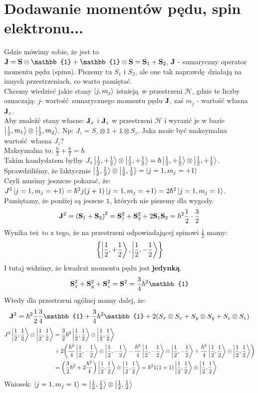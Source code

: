 \documentclass[12pt,a4paper]{report}
\newcommand{\Id}{\mathbb{1}}
\renewcommand{\emph}{\textbf}
\newenvironment{lecture}[1]{\par\medskip
   \noindent\chapter{#1} \rmfamily}{\medskip}
\begin{document}
\begin{lecture}{Dodawanie momentów pędu, spin elektronu...}
\[    \]
    Gdzie mówimy sobie, że jest to $\vb{J} = \vb{S} \otimes \Id + \Id \otimes \vb{S} = \vb{S}_1 + \vb{S}_2$, $\vb{J}$ - sumaryczny operator momentu pędu (spinu). Piszemy tu $S_1$ i $S_2$, ale one tak naprawdę działają na innych przestrzeniach, co warto pamiętać.\\
    Chcemy wiedzieć jakie stany $\ket{j, m_j}$ istnieją w przestrzeni $\mathcal{H}$, gdzie te liczby oznaczają: $j$- wartość sumarycznego momentu pędu $\vb{J}$, zaś $m_j$ - wartość własna $\vb{J}_z$.\\
    Aby znaleźć stany własne: $\vb{J}_x$ i $\vb{J}_z$ w przestrzeni $\mathcal{H}$ i wyrazić je w bazie $\ket{\frac12, m_1} \otimes \ket{\frac12, m_2}$. Np:
    $J_z = S_z \otimes \Id + \Id \otimes S_z$. Jaka może być maksymalna wartość własna $J_z$? \\
    Maksymalna to: $\frac{\hbar}{2} + \frac{\hbar}{2} = \hbar$\\
    Takim kandydatem byłby $J_z \ket{\frac12, +\frac12} \otimes \ket{\frac12, +\frac12} = \hbar \ket{\frac12, + \frac12} \otimes \ket{\frac12, +\frac12}$.\\
    Sprawdziliśmy, że faktycznie $\ket{\frac12, \frac12} \otimes \ket{\frac12, \frac12} = \ket{j=1, m_j = + 1}$\\
    Czyli musimy jeszzcze pokazać, że: $J^2 \ket{j = 1, m_j = +1} = \hbar^2 j(j+1) \ket{j=1, m_j = +1} = 2\hbar^2 \ket{j=1, m_j = 1}$.\\
    {\color{Cyan} Pamiętamy, że poniżej są jeszcze $\Id$, których nie piszemy dla wygody.}
    \[
        \vb{J}^2 = \qty(\vb{S}_1 + \vb{S}_2)^2 = \vb{S}_1^2 + \vb{S}_2^2 + 2 \vb{S}_1 \vb{S}_2 = \hbar^2 \frac12 \cdot \frac32    
    \]
    Wynika też to z tego, że na przestrzeni odpowiadającej spinowi $\frac12$ mamy:
    \[
        \qty{\ket{\frac12, +\frac12}, \ket{\frac12, -\frac12}}    
    \]
    I tutaj widzimy, że kwadrat momentu pędu jest \emph{jedynką}.
    \[
        \vb{S}_x^2 + \vb{S}_y^2 + \vb{S}_z^2 = \vb{S}^2 = \frac34 \hbar^2 \Id    
    \]
    Wtedy dla przestrzeni ogólnej mamy dalej, że:
    \[
        \vb{J}^2 = \hbar^2 \frac12 \frac34 \Id + \frac34 \hbar^2 \Id + 2 \qty(S_x\otimes S_x + S_y \otimes S_y + S_z \otimes S_z)    
    \]
    \begin{align*}
        J^2 \ket{\frac12, \frac12} \otimes \ket{\frac12, \frac12} &= \frac32 \hbar^2 \ket{\frac12, \frac12} \otimes \ket{\frac12, \frac12}\\
         &+ 2 \qty(\frac{\hbar^2}{4} \ket{\frac12, -\frac12} \otimes \ket{\frac12, -\frac12} - \frac{\hbar^2}{4} \ket{\frac12, -\frac12} \otimes \ket{\frac12, -\frac12} + \frac{\hbar^2}{4} \ket{\frac12, \frac12} \otimes \ket{\frac12, \frac12})\\
         &= \qty(\frac32 \hbar^2 + 2 \frac{\hbar^2}{4}) \ket{\frac12, \frac12} \otimes \ket{\frac12, \frac12} = \hbar^2 1(1 + 1) \ket{\frac12, \frac12} \otimes \ket{\frac12, \frac12}
    \end{align*}
    Wniosek: $\ket{j=1, m_j = 1} = \ket{\frac12, \frac12} \otimes \ket{\frac12, \frac12}$  
\end{lecture}
\end{document}
